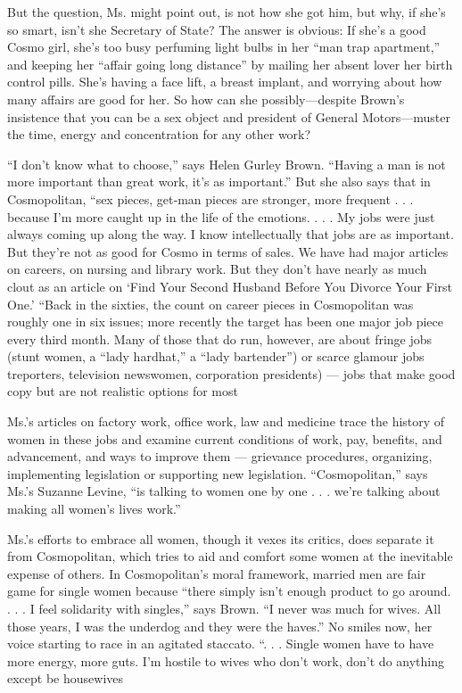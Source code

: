 But the question, Ms. might point out, is not how she got him, but why,
if she's so smart, isn't she Secretary of State? The answer is obvious:
If she's a good Cosmo girl, she's too busy perfuming light bulbs in her
``man trap apartment,'' and keeping her ``affair going long distance''
by mailing her absent lover her birth control pills. She's having a face
lift, a breast implant, and worrying about how many affairs are good for
her. So how can she possibly---despite Brown's insistence that you can
be a sex object and president of General Motors---muster the time,
energy and concentration for any other work?

``I don't know what to choose,'' says Helen Gurley Brown. ``Having a man
is not more important than great work, it's as important.'' But she also
says that in Cosmopolitan, ``sex pieces, get‐man pieces are stronger,
more frequent . . . because I'm more caught up in the life of the
emotions. . . . My jobs were just always coming up along the way. I know
intellectually that jobs are as important. But they're not as good for
Cosmo in terms of sales. We have had major articles on careers, on
nursing and library work. But they don't have nearly as much clout as an
article on `Find Your Second Husband Before You Divorce Your First One.'
``Back in the sixties, the count on career pieces in Cosmopolitan was
roughly one in six issues; more recently the target has been one major
job piece every third month. Many of those that do run, however, are
about fringe jobs (stunt women, a ``lady hardhat,'' a ``lady
bartender'') or scarce glamour jobs treporters, television newswomen,
corporation presidents) --- jobs that make good copy but are not
realistic options for most

Ms.'s articles on factory work, office work, law and medicine trace the
history of women in these jobs and examine current conditions of work,
pay, benefits, and advancement, and ways to improve them --- grievance
procedures, organizing, implementing legislation or supporting new
legislation. ``Cosmopolitan,'' says Ms.'s Suzanne Levine, ``is talking
to women one by one . . . we're talking about making all women's lives
work.''

Ms.'s efforts to embrace all women, though it vexes its critics, does
separate it from Cosmopolitan, which tries to aid and comfort some women
at the inevitable expense of others. In Cosmopolitan's moral framework,
married men are fair game for single women because ``there simply isn't
enough product to go around. . . . I feel solidarity with singles,''
says Brown. ``I never was much for wives. All those years, I was the
underdog and they were the haves.'' No smiles now, her voice starting to
race in an agitated staccato. ``. . . Single women have to have more
energy, more guts. I'm hostile to wives who don't work, don't do
anything except be housewives

